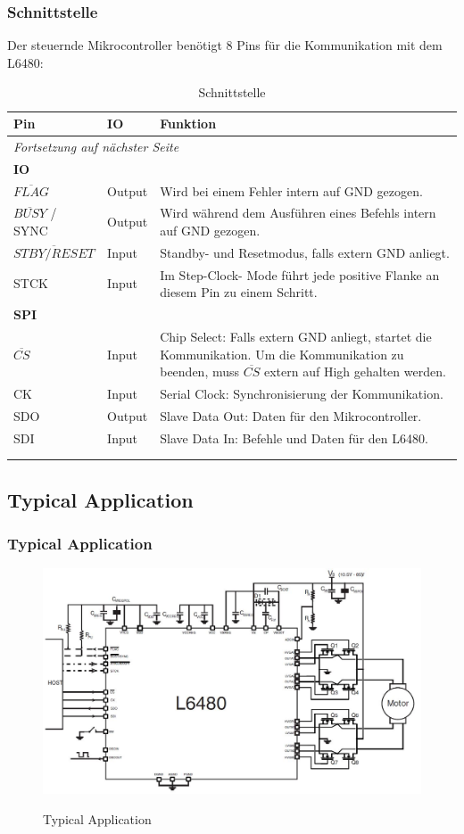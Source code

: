 		 \subsubsection{Schnittstelle}
		 \fi
	  		Der steuernde Mikrocontroller benötigt 8 Pins für die Kommunikation mit dem L6480: 
	  		\begin{longtable}{l l p{7cm}} \toprule
	  			\textbf{Pin} 	& \textbf{IO} 	& \textbf{Funktion} \\
	  			\midrule
	  			\endhead
	  			\multicolumn{3}{l}{\emph{Fortsetzung auf nächster Seite}} \\ \bottomrule \endfoot \endlastfoot 			
	  			\textbf{IO}\\ \addlinespace
	  			$\overline{FLAG}$& Output 				& Wird bei einem Fehler intern auf GND gezogen. \\ \addlinespace
	  			$\overline{BUSY}$ / SYNC & Output		& Wird während dem Ausführen eines Befehls intern auf GND gezogen.\\ \addlinespace
	  			$\overline{STBY / RESET}$& Input		& Standby- und Resetmodus, falls extern GND anliegt. \\ \addlinespace
	  			STCK			& Input			& Im Step-Clock- Mode führt jede positive Flanke an diesem Pin zu einem Schritt. \\ \addlinespace
	  			\textbf{SPI}\\ \addlinespace
	  			$\overline{CS}$	& Input			& Chip Select: Falls extern GND anliegt, startet die Kommunikation. Um die Kommunikation zu beenden, muss $\overline{CS}$ extern auf High gehalten werden. \\ \addlinespace
	  			CK				& Input			& Serial Clock: Synchronisierung der Kommunikation. \\ \addlinespace
	  			SDO				& Output		& Slave Data Out: Daten für den Mikrocontroller. \\ \addlinespace
	  			SDI				& Input			& Slave Data In: Befehle und Daten für den L6480. \\ \addlinespace
	  			\bottomrule
	  			\\
	  			\caption{Schnittstelle} 
	  			\label{Schnittstelle}
	  		\end{longtable}	
	  	\ifSTANDALONE	
	 	\subsection{Typical Application}
	 	\fi
	 	\ifEMBED
	 	\subsubsection{Typical Application}
	 	\fi
			 	\begin{figure}[h]
			 		\centering
			 		\includegraphics[width=12cm]{src/Bilder/typicalApp.jpg}
			 		\label{fig:typApp}
			 		\caption{Typical Application}
			 	\end{figure}